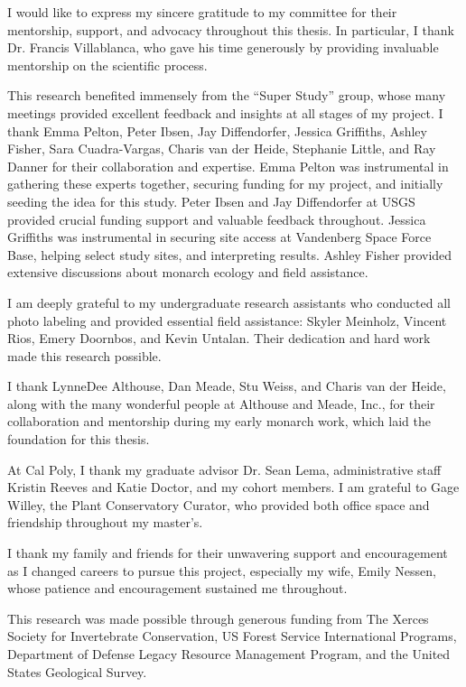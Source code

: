 
\begin{acknowledgments}

    I would like to express my sincere gratitude to my committee for their mentorship, support, and advocacy throughout this thesis. In particular, I thank Dr. Francis Villablanca, who gave his time generously by providing invaluable mentorship on the scientific process.

    This research benefited immensely from the ``Super Study'' group, whose many meetings provided excellent feedback and insights at all stages of my project. I thank Emma Pelton, Peter Ibsen, Jay Diffendorfer, Jessica Griffiths, Ashley Fisher, Sara Cuadra-Vargas, Charis van der Heide, Stephanie Little, and Ray Danner for their collaboration and expertise. Emma Pelton was instrumental in gathering these experts together, securing funding for my project, and initially seeding the idea for this study. Peter Ibsen and Jay Diffendorfer at USGS provided crucial funding support and valuable feedback throughout. Jessica Griffiths was instrumental in securing site access at Vandenberg Space Force Base, helping select study sites, and interpreting results. Ashley Fisher provided extensive discussions about monarch ecology and field assistance.

    I am deeply grateful to my undergraduate research assistants who conducted all photo labeling and provided essential field assistance: Skyler Meinholz, Vincent Rios, Emery Doornbos, and Kevin Untalan. Their dedication and hard work made this research possible.

    I thank LynneDee Althouse, Dan Meade, Stu Weiss, and Charis van der Heide, along with the many wonderful people at Althouse and Meade, Inc., for their collaboration and mentorship during my early monarch work, which laid the foundation for this thesis.

    At Cal Poly, I thank my graduate advisor Dr. Sean Lema, administrative staff Kristin Reeves and Katie Doctor, and my cohort members. I am grateful to Gage Willey, the Plant Conservatory Curator, who provided both office space and friendship throughout my master's.

    I thank my family and friends for their unwavering support and encouragement as I changed careers to pursue this project, especially my wife, Emily Nessen, whose patience and encouragement sustained me throughout.

    This research was made possible through generous funding from The Xerces Society for Invertebrate Conservation, US Forest Service International Programs, Department of Defense Legacy Resource Management Program, and the United States Geological Survey.

\end{acknowledgments}
